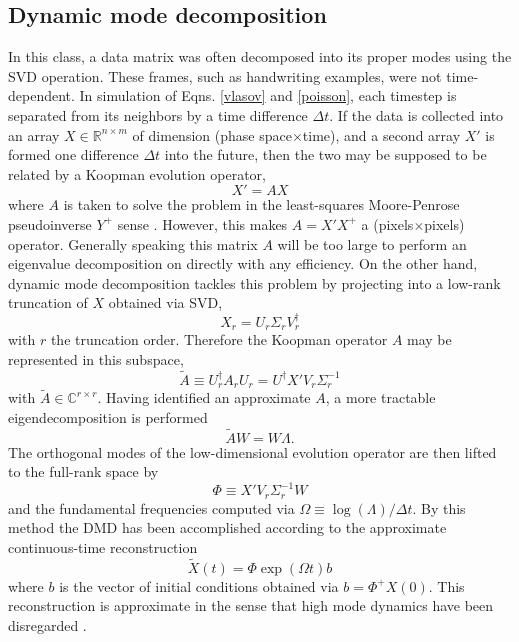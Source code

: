 \documentclass{article}
\begin{document}
\subsection{Dynamic mode decomposition}
In this class, a data matrix was often decomposed into its proper modes using the SVD operation. These frames, such as handwriting examples, were not time-dependent. In simulation of Eqns. \ref{vlasov} and \ref{poisson}, each timestep is separated from its neighbors by a time difference $\Delta t$. If the data is collected into an array $X\in\mathbb{R}^{n\times m}$ of dimension (phase space$\times$time), and a second array $X'$ is formed one difference $\Delta t$ into the future, then the two may be supposed to be related by a Koopman evolution operator,
\begin{equation}
  X' = AX
\end{equation}
where $A$ is taken to solve the problem in the least-squares Moore-Penrose pseudoinverse $Y^+$ sense \cite{kutz}. However, this makes $A = X'X^+$ a (pixels$\times$pixels) operator. Generally speaking this matrix $A$ will be too large to perform an eigenvalue decomposition on directly with any efficiency. On the other hand, dynamic mode decomposition tackles this problem by projecting into a low-rank truncation of $X$ obtained via SVD,
\begin{equation}
  X_r = U_r\Sigma_rV_r^\dagger
\end{equation}
with $r$ the truncation order. Therefore the Koopman operator $A$ may be represented in this subspace,
\begin{equation}
  \widetilde{A} \equiv U_r^\dagger A_rU_r = U^\dagger X'V_r\Sigma_r^{-1}
\end{equation}
with $\widetilde{A}\in\mathbb{C}^{r\times r}$. Having identified an approximate $A$, a more tractable eigendecomposition is performed
\begin{equation}
  \widetilde{A}W = W\Lambda.\label{eigs}
\end{equation}
The orthogonal modes of the low-dimensional evolution operator are then lifted to the full-rank space by
\begin{equation}
  \Phi \equiv X'V_r\Sigma_r^{-1}W
\end{equation}
and the fundamental frequencies computed via $\Omega \equiv \log(\Lambda)/\Delta t$. By this method the DMD has been accomplished according to the approximate continuous-time reconstruction
\begin{equation}
  \widetilde{X}(t) = \Phi\exp(\Omega t)b
\end{equation}
where $b$ is the vector of initial conditions obtained via $b = \Phi^+X(0)$. This reconstruction is approximate in the sense that high mode dynamics have been disregarded \cite{kutz_dmd}.
\end{document}
